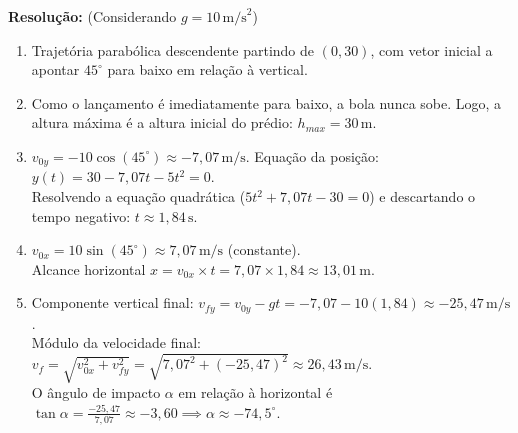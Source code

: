\documentclass[12pt]{article}
\begin{document}
	\vspace{0.4cm}
	\textbf{Resolução:} (Considerando $g = 10\,\text{m/s}^2$)
	\begin{enumerate}[label=\alph*), itemsep=12pt]
		\item Trajetória parabólica descendente partindo de $(0, 30)$, com vetor inicial a apontar $45^\circ$ para baixo em relação à vertical.
		\item Como o lançamento é imediatamente para baixo, a bola nunca sobe. Logo, a altura máxima é a altura inicial do prédio: $h_{max} = 30\,\text{m}$.
		\item $v_{0y} = -10 \cos(45^\circ) \approx -7,07\,\text{m/s}$. Equação da posição: $y(t) = 30 - 7,07t - 5t^2 = 0$. \\
		Resolvendo a equação quadrática ($5t^2 + 7,07t - 30 = 0$) e descartando o tempo negativo: $t \approx 1,84\,\text{s}$.
		\item $v_{0x} = 10 \sin(45^\circ) \approx 7,07\,\text{m/s}$ (constante). \\
		Alcance horizontal $x = v_{0x} \times t = 7,07 \times 1,84 \approx 13,01\,\text{m}$.
		\item Componente vertical final: $v_{fy} = v_{0y} - gt = -7,07 - 10(1,84) \approx -25,47\,\text{m/s}$. \\
		Módulo da velocidade final: $v_f = \sqrt{v_{0x}^2 + v_{fy}^2} = \sqrt{7,07^2 + (-25,47)^2} \approx 26,43\,\text{m/s}$. \\
		O ângulo de impacto $\alpha$ em relação à horizontal é $\tan \alpha = \frac{-25,47}{7,07} \approx -3,60 \implies \alpha \approx -74,5^\circ$.
	\end{enumerate}
	
\end{document}
